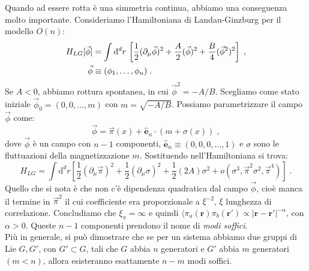 \documentclass[10pt,a4paper]{report}
\theoremstyle{definition}
\numberwithin{equation}{section}
\newcommand{\diff}[1][]{\mathrm{d}#1}
\newcommand{\bra}{\langle}
\begin{document}
Quando ad essere rotta è una simmetria continua, abbiamo una conseguenza molto importante. Consideriamo l'Hamiltoniana di Landau-Ginzburg per il modello $O(n)$:
\begin{align}
H_{LG}[\vec{\phi}]&=\int\diff^d{r}\,\left[\frac{1}{2}(\partial_{\mu}\vec{\phi})^2+\frac{A}{2}(\vec{\phi})^2+\frac{B}{4}(\vec{\phi}^2)^2\right]\;, \\
\vec{\phi} &\equiv (\phi_1,\ldots,\phi_n)\;. \notag
\end{align}
Se $A<0$, abbiamo rottura spontanea, in cui $\vec{\phi}^2=-A/B$. Scegliamo come stato iniziale $\vec{\phi}_0=(0,0,\ldots,m)$ con $m=\sqrt{-A/B}$. Possiamo parametrizzare il campo $\vec{\phi}$ come:
\begin{equation}
\vec{\phi}=\vec{\pi}(x)+\hat{\mathbf{e}}_n\cdot(m+\sigma(x))\;,
\end{equation}
dove $\vec{\phi}$ è un campo con $n-1$ componenti, $\hat{\mathbf{e}}_n\equiv (0,0,0,\ldots, 1)$ e $\sigma$ sono le fluttuazioni della magnetizzazione $m$. Sostituendo nell'Hamiltoniana si trova:
\begin{equation}
H_{LG}=\int\diff^d{r}\left[\frac{1}{2}(\partial_{\mu}\vec{\pi})^2+\frac{1}{2}(\partial_{\mu}\sigma)^2+\frac{1}{2}(2A)\sigma^2+o(\sigma^3,\vec{\pi}^2\sigma^2,\vec{\pi}^4)\right]\;.
\end{equation}
Quello che si nota è che non c'è dipendenza quadratica dal campo $\vec{\phi}$, cioè manca il termine in $\vec{\pi}^2$ il cui coefficiente era proporzionale a $\xi^{-2}$, $\xi$ lunghezza di correlazione. Concludiamo che $\xi_{\pi}=\infty$ e quindi $\bra \pi_a(\mathbf{r})\pi_b(\mathbf{r}')\propto |\mathbf{r}-\mathbf{r}'|^{-\alpha}$, con $\alpha>0$. Queste $n-1$ componenti prendono il nome di \emph{modi soffici}. \\
Più in generale, si può dimostrare che se per un sistema abbiamo due gruppi di Lie $G,G'$, con $G'\subset G$, tali che $G$ abbia $n$ generatori e $G'$ abbia $m$ generatori $(m<n)$, allora esisteranno esattamente $n-m$ modi soffici.
\end{document}
